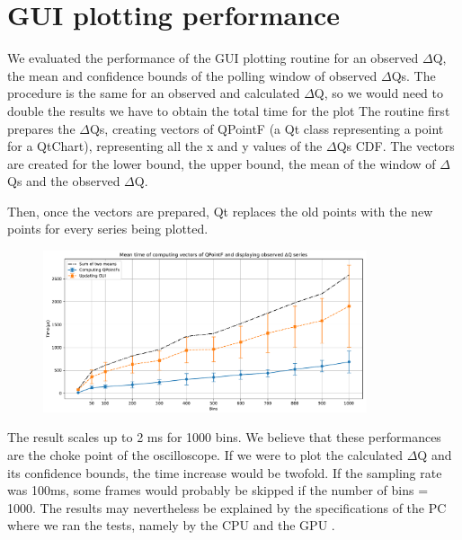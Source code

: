 \section{GUI plotting performance}
    We evaluated the performance of the GUI plotting routine for an observed $\Delta$Q, the mean and confidence bounds of the polling window of observed $\Delta$Qs. The procedure is the same for an observed and calculated $\Delta$Q, so we would need to double the results we have to obtain the total time for the plot
    The routine first prepares the $\Delta$Qs, creating vectors of QPointF (a Qt class representing a point for a QtChart), representing all the x and y values of the $\Delta$Qs CDF. The vectors are created for the lower bound, the upper bound, the mean of the window of $\Delta$Qs and the observed $\Delta$Q.

    Then, once the vectors are prepared, Qt replaces the old points with the new points for every series being plotted.

    \begin{figure}[H]
        \begin{center}
            \includegraphics[width = 0.85\textwidth]{img/plots.pdf}
        \end{center}
    \end{figure}
    
    The result scales up to 2 ms for 1000 bins. We believe that these performances are the choke point of the oscilloscope. If we were to plot the calculated $\Delta$Q and its confidence bounds, the time increase would be twofold. If the sampling rate was 100ms, some frames would probably be skipped if the number of bins = 1000. The results may nevertheless be explained by the specifications of the PC where we ran the tests, namely by the CPU and the GPU \cite{pc_spec}.
